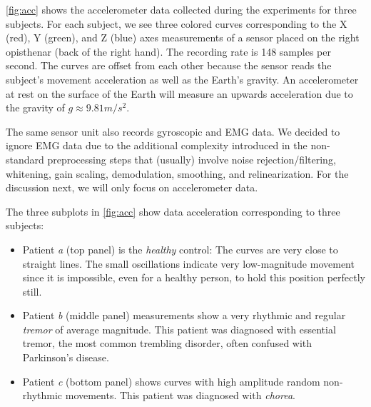 \cref{fig:acc} shows the accelerometer data collected during the experiments for three subjects. For each subject, we see three colored curves corresponding to the X (red), Y (green), and Z (blue) axes measurements of a sensor placed on the right opisthenar (back of the right hand). The recording rate is 148 samples per second. The curves are offset from each other because the sensor reads the subject's movement acceleration as well as the Earth's gravity. An accelerometer at rest on the surface of the Earth will measure an upwards acceleration due to the gravity of $g \approx 9.81 m/s^2$. 

The same sensor unit also records gyroscopic and EMG data. We decided to ignore EMG data due to the additional complexity introduced in the non-standard preprocessing steps that (usually) involve noise rejection/filtering, whitening, gain scaling, demodulation, smoothing, and relinearization. For the  discussion next, we will only focus on accelerometer data.

The three subplots in \cref{fig:acc} show data acceleration corresponding to three subjects: 
\begin{itemize}
  \item Patient \textit{a} (top panel) is the \emph{healthy} control: The curves are very close to straight lines. The small oscillations indicate very low-magnitude movement since it is impossible, even for a healthy person, to hold this position perfectly still.
  \item Patient \textit{b} (middle panel) measurements show a very rhythmic and regular \emph{tremor} of average magnitude. This patient was diagnosed with essential tremor, the most common trembling disorder, often confused with Parkinson's disease.
  \item Patient \textit{c} (bottom panel) shows curves with high amplitude random non-rhythmic movements. This patient was diagnosed with \emph{chorea}. 
\end{itemize}
 

